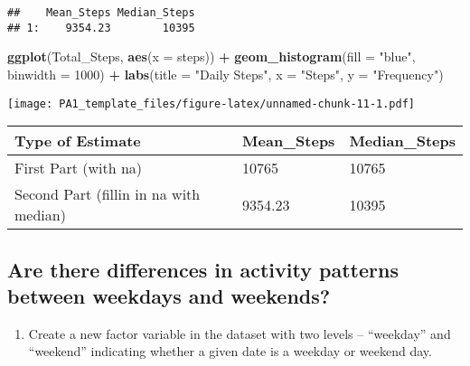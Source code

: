 \documentclass[
]{article}
\newenvironment{Shaded}{\begin{snugshade}}{\end{snugshade}}
\newcommand{\DataTypeTok}[1]{\textcolor[rgb]{0.13,0.29,0.53}{#1}}
\newcommand{\DecValTok}[1]{\textcolor[rgb]{0.00,0.00,0.81}{#1}}
\newcommand{\KeywordTok}[1]{\textcolor[rgb]{0.13,0.29,0.53}{\textbf{#1}}}
\newcommand{\NormalTok}[1]{#1}
\newcommand{\OperatorTok}[1]{\textcolor[rgb]{0.81,0.36,0.00}{\textbf{#1}}}
\newcommand{\StringTok}[1]{\textcolor[rgb]{0.31,0.60,0.02}{#1}}
\providecommand{\tightlist}{%
  \setlength{\itemsep}{0pt}\setlength{\parskip}{0pt}}
\begin{document}
\begin{verbatim}
##    Mean_Steps Median_Steps
## 1:    9354.23        10395
\end{verbatim}

\begin{Shaded}
\begin{Highlighting}[]
\KeywordTok{ggplot}\NormalTok{(Total_Steps, }\KeywordTok{aes}\NormalTok{(}\DataTypeTok{x =}\NormalTok{ steps)) }\OperatorTok{+}\StringTok{ }\KeywordTok{geom_histogram}\NormalTok{(}\DataTypeTok{fill =} \StringTok{"blue"}\NormalTok{, }\DataTypeTok{binwidth =} \DecValTok{1000}\NormalTok{) }\OperatorTok{+}\StringTok{ }\KeywordTok{labs}\NormalTok{(}\DataTypeTok{title =} \StringTok{"Daily Steps"}\NormalTok{, }\DataTypeTok{x =} \StringTok{"Steps"}\NormalTok{, }\DataTypeTok{y =} \StringTok{"Frequency"}\NormalTok{)}
\end{Highlighting}
\end{Shaded}

\texttt{[image: PA1\_template\_files/figure-latex/unnamed-chunk-11-1.pdf]}

\begin{longtable}[]{@{}lll@{}}
\toprule
Type of Estimate & Mean\_Steps & Median\_Steps\tabularnewline
\midrule
\endhead
First Part (with na) & 10765 & 10765\tabularnewline
Second Part (fillin in na with median) & 9354.23 & 10395\tabularnewline
\bottomrule
\end{longtable}

\hypertarget{are-there-differences-in-activity-patterns-between-weekdays-and-weekends}{%
\subsection{Are there differences in activity patterns between weekdays
and
weekends?}\label{are-there-differences-in-activity-patterns-between-weekdays-and-weekends}}

\begin{enumerate}
\def\labelenumi{\arabic{enumi}.}
\tightlist
\item
  Create a new factor variable in the dataset with two levels --
  ``weekday'' and ``weekend'' indicating whether a given date is a
  weekday or weekend day.
\end{enumerate}
\end{document}
